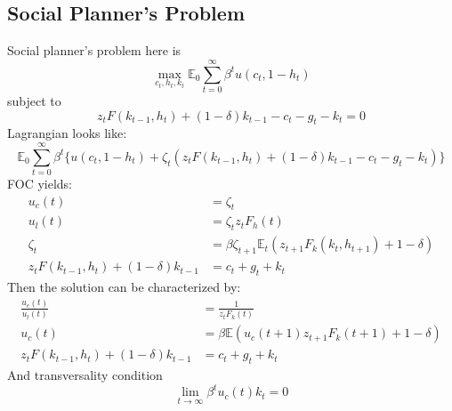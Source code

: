 \documentclass[12pt]{article}
\newcommand{\E}{\mathbb{E}}
\begin{document}
	\subsection{Social Planner's Problem}
	Social planner's problem here is
	\begin{equation*}
		\max_{c_t, h_t, k_t} \E_0 \sum_{t=0}^\infty \beta^t u(c_t, 1-h_t)
	\end{equation*}
	subject to
	\begin{equation*}
		z_t F(k_{t-1}, h_t) + (1-\delta)k_{t-1} - c_t - g_t - k_t = 0
	\end{equation*}
	Lagrangian looks like:
	\begin{equation*}
		\E_0 \sum_{t=0}^\infty \beta^t \Big\{u(c_t, 1-h_t) + \zeta_t (z_t F(k_{t-1}, h_t) + (1-\delta)k_{t-1} - c_t - g_t - k_t)  \Big\}
	\end{equation*}
	FOC yields:
	\begin{align*}
		u_c(t) &= \zeta_t\\
		u_l(t) &= \zeta_t z_t F_h(t)\\
		\zeta_t &= \beta \zeta_{t+1}\E_t (z_{t+1}F_k(k_t, h_{t+1}) + 1 - \delta)\\
		z_t F(k_{t-1}, h_t) + (1-\delta)k_{t-1} &=  c_t + g_t + k_t
	\end{align*}
	Then the solution can be characterized by:
	\begin{align*}
		\frac{u_c(t)}{u_l(t)} &= \frac{1}{z_t F_k(t)}\\
		u_c(t) &= \beta \E(u_c(t+1)z_{t+1} F_k(t+1) + 1 - \delta)\\
		z_t F(k_{t-1}, h_t) + (1-\delta)k_{t-1} &=  c_t + g_t + k_t
	\end{align*}
	And transversality condition
	\begin{equation*}
		\lim_{t \rightarrow \infty} \beta^t u_c(t) k_t = 0
	\end{equation*}
	
\end{document}
